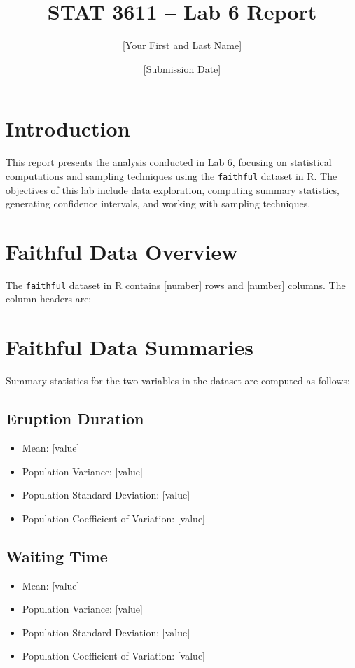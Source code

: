 \documentclass[a4paper,12pt]{article}
\title{STAT 3611 – Lab 6 Report}
\author{[Your First and Last Name]}
\date{[Submission Date]}
\begin{document}
\maketitle

\section{Introduction}
This report presents the analysis conducted in Lab 6, focusing on statistical computations and sampling techniques using the \texttt{faithful} dataset in R. The objectives of this lab include data exploration, computing summary statistics, generating confidence intervals, and working with sampling techniques.

\section{Faithful Data Overview}
The \texttt{faithful} dataset in R contains [number] rows and [number] columns. The column headers are:



\section{Faithful Data Summaries}
Summary statistics for the two variables in the dataset are computed as follows:

\subsection{Eruption Duration}
\begin{itemize}
    \item Mean: [value]
    \item Population Variance: [value]
    \item Population Standard Deviation: [value]
    \item Population Coefficient of Variation: [value]
\end{itemize}

\subsection{Waiting Time}
\begin{itemize}
    \item Mean: [value]
    \item Population Variance: [value]
    \item Population Standard Deviation: [value]
    \item Population Coefficient of Variation: [value]
\end{itemize}
\end{document}
